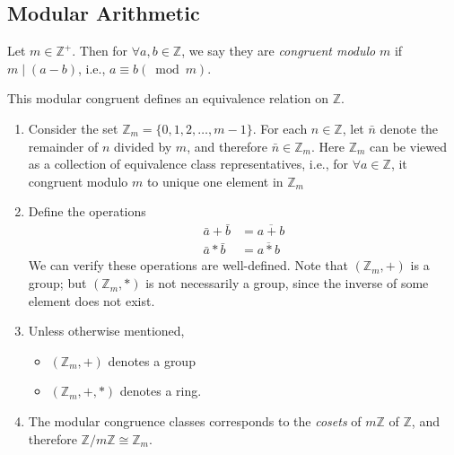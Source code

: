 \subsection{Modular Arithmetic}
\begin{definition}
Let $m\in\mathbb{Z}^+$. Then for $\forall a,b\in\mathbb{Z}$, we say they are \emph{congruent modulo} $m$ if $m\mid(a-b)$, i.e., $a\equiv b(\bmod m)$.
\end{definition}
This modular congruent defines an equivalence relation on $\mathbb{Z}$.
\begin{remark}
\begin{enumerate}
\item
Consider the set $\mathbb{Z}_m=\{0,1,2,\dots,m-1\}$. For each $n\in\mathbb{Z}$, let $\bar n$ denote the remainder of $n$ divided by $m$, and therefore $\bar n\in\mathbb{Z}_m$. Here $\mathbb{Z}_m$ can be viewed as a collection of equivalence class representatives, i.e., for $\forall a\in\mathbb{Z}$, it congruent modulo $m$ to unique one element in $\mathbb{Z}_m$
\item
Define the operations
\begin{align*}
\bar{a}+\bar{b}&=\overline{a+b}\\
\bar{a}*\bar{b}&=\overline{a*b}
\end{align*}
We can verify these operations are well-defined. Note that $(\mathbb{Z}_m,+)$ is a group; but $(\mathbb{Z}_m,*)$ is not necessarily a group, since the inverse of some element does not exist.
\item
Unless otherwise mentioned,
\begin{itemize}
\item
$(\mathbb{Z}_m,+)$ denotes a group
\item
$(\mathbb{Z}_m,+,*)$ denotes a ring.
\end{itemize}
\item
The modular congruence classes corresponds to the \emph{cosets} of $m\mathbb{Z}$ of $\mathbb{Z}$, and therefore $\mathbb{Z}/m\mathbb{Z}\cong\mathbb{Z}_m$.
\end{enumerate}
\end{remark}

